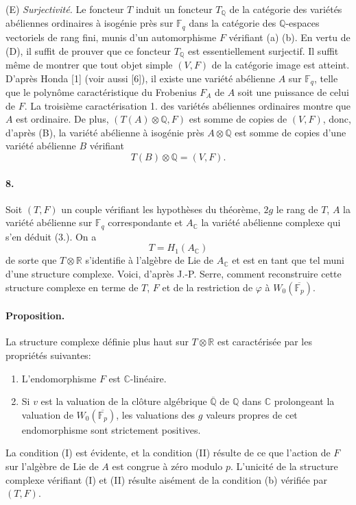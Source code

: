 \documentclass[10pt]{article}
\newcommand{\C}{\mathbb C}
\newcommand{\Fp}{\mathbb F_p}
\newcommand{\Fq}{\mathbb F_q}
\newcommand{\Q}{\mathbb Q}
\newcommand{\R}{\mathbb R}
\newcommand{\Ac}{A_{\C}}
\begin{document}
(E) \emph{Surjectivité.} Le foncteur $T$ induit un foncteur $T_\Q$ de la catégorie des variétés abéliennes ordinaires à isogénie près sur $\Fq$ dans la catégorie des $\Q$-espaces vectoriels de rang fini, munis d'un automorphisme $F$ vérifiant (a) (b). En vertu de (D), il suffit de prouver que ce foncteur $T_\Q$ est essentiellement surjectif. Il suffit même de montrer que tout objet simple $(V,F)$ de la catégorie image est atteint. D'après Honda [1] (voir aussi [6]), il existe une variété abélienne $A$ sur $\Fq$, telle que le polynôme caractéristique du Frobenius $F_A$ de $A$ soit une puissance de celui de $F$. La troisième caractérisation 1. des variétés abéliennes ordinaires montre que $A$ est ordinaire. De plus, $(T(A)\otimes\Q,F)$ est somme de copies de $(V,F)$, donc, d'après (B), la variété abélienne à isogénie près $A\otimes\Q$ est somme de copies d'une variété abélienne $B$ vérifiant
\[
T(B)\otimes\Q=(V,F).
\]

\paragraph{8.} Soit $(T,F)$ un couple vérifiant les hypothèses du théorème, $2g$ le rang de $T$, $A$ la variété abélienne sur $\Fq$ correspondante et $\Ac$ la variété abélienne complexe qui s'en déduit (3.). On a
\[
T=H_1(\Ac)
\]
de sorte que $T\otimes\R$ s'identifie à l'algèbre de Lie de $\Ac$ et est en tant que tel muni d'une structure complexe. Voici, d'après J.-P. Serre, comment reconstruire cette structure complexe en terme de $T$, $F$ et de la restriction de $\varphi$ à $W_0(\overline{\Fp})$.

\paragraph{Proposition.} La structure complexe définie plus haut sur $T\otimes\R$ est caractérisée par les propriétés suivantes:
\begin{enumerate}[label=(\Roman*)]
\item L'endomorphisme $F$ est $\C$-linéaire.
\item Si $v$ est la valuation de la clôture algébrique $\overline{\Q}$ de $\Q$ dans $\C$ prolongeant la valuation de $W_0(\overline{\Fp})$, les valuations des $g$ valeurs propres de cet endomorphisme sont strictement positives.
\end{enumerate}
La condition (I) est évidente, et la condition (II) résulte de ce que l'action de $F$ sur l'algèbre de Lie de $A$ est congrue à zéro modulo $p$. L'unicité de la structure complexe vérifiant (I) et (II) résulte aisément de la condition (b) vérifiée par $(T,F)$.
\end{document}
